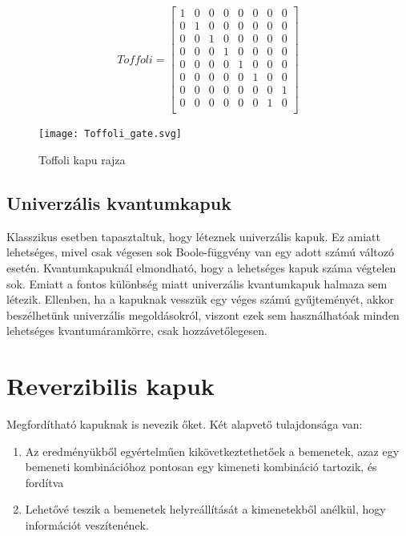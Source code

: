 \documentclass[
]{thesis-ekf}
\theoremstyle{definition}
\theoremstyle{remark}
\begin{document}
\begin{equation}
	Toffoli= 
	\begin{bmatrix}
		1 & 0 & 0 & 0 & 0 & 0 & 0 & 0\\
		0 & 1 & 0 & 0 & 0 & 0 & 0 & 0\\
		0 & 0 & 1 & 0 & 0 & 0 & 0 & 0\\
		0 & 0 & 0 & 1 & 0 & 0 & 0 & 0\\
		0 & 0 & 0 & 0 & 1 & 0 & 0 & 0\\
		0 & 0 & 0 & 0 & 0 & 1 & 0 & 0\\
		0 & 0 & 0 & 0 & 0 & 0 & 0 & 1\\
		0 & 0 & 0 & 0 & 0 & 0 & 1 & 0\\
	\end{bmatrix}
\end{equation}

\begin{figure}[H]
	\centering
	\texttt{[image: Toffoli\_gate.svg]}
	\caption{Toffoli kapu rajza}
	\label{fig:toffoligate}
\end{figure}


\subsection{Univerzális kvantumkapuk}
Klasszikus esetben tapasztaltuk, hogy léteznek univerzális kapuk. Ez amiatt lehetséges, mivel csak végesen sok Boole-függvény van egy adott számú változó esetén. Kvantumkapuknál elmondható, hogy a lehetséges kapuk száma végtelen sok. Emiatt a fontos különbség miatt univerzális kvantumkapuk halmaza sem létezik. Ellenben, ha a kapuknak vesszük egy véges számú gyűjteményét, akkor beszélhetünk univerzális megoldásokról, viszont ezek sem használhatóak minden lehetséges kvantumáramkörre, csak hozzávetőlegesen.\cite{Chris Bernhardt}

\section{Reverzibilis kapuk}
Megfordítható kapuknak is nevezik őket. Két alapvető tulajdonsága van:
\begin{enumerate}
	\item Az eredményükből egyértelműen kikövetkeztethetőek a bemenetek, azaz egy bemeneti kombinációhoz pontosan egy kimeneti kombináció tartozik, és fordítva
	\item Lehetővé teszik a bemenetek helyreállítását a kimenetekből anélkül, hogy információt veszítenének.
\end{enumerate}
\end{document}
